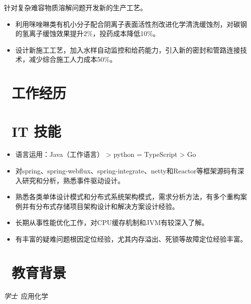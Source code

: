 \documentclass{resume}
\begin{document}
\begin{onehalfspacing}
针对复杂难容物质溶解问题开发新的生产工艺。
\begin{itemize}
  \item 利用咪唑啉类有机小分子配合阴离子表面活性剂改进化学清洗缓蚀剂，对碳钢的氢离子缓蚀效果提升2\%，投药成本降低10\%。
  \item 设计新施工工艺，加入水样自动监控和给药能力，引入新的密封和管路连接技术，减少综合施工人力成本50\%。
\end{itemize}
\end{onehalfspacing}

\section{\faUsers\ 工作经历}




\section{\faCogs\ IT 技能}
\begin{itemize}[parsep=0.5ex]
  \item 语言运用：Java（工作语言） > python = TypeScript > Go
  \item 对spring、spring-webflux、spring-integrate、netty和Reactor等框架源码有深入研究和分析，熟悉事件驱动设计。
  \item 熟悉各类单体设计模式和分布式系统架构模式，需求分析方法，有多个重构案例并有分布式存储项目架构设计和解决方案设计经验。
  \item 长期从事性能优化工作，对CPU缓存机制和JVM有较深入了解。
  \item 有丰富的疑难问题根因定位经验，尤其内存溢出、死锁等故障定位经验丰富。
\end{itemize}

\section{\faGraduationCap\  教育背景}
\textit{学士}\ 应用化学

\end{document}
